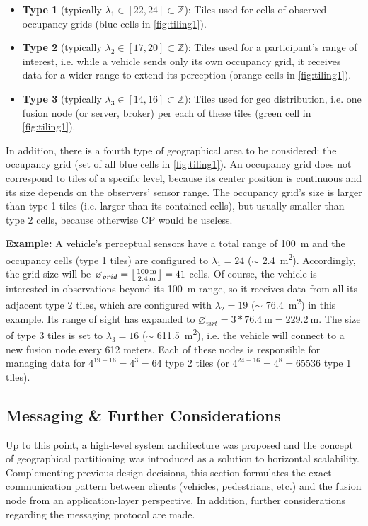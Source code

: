 \begin{itemize}
	\item \textbf{Type 1} (typically $\lambda_1 \in [22, 24] \subset \mathbb{Z}$): Tiles used for cells of observed occupancy grids (blue cells in \cref{fig:tiling1}).
	\item \textbf{Type 2} (typically $\lambda_2 \in [17, 20] \subset \mathbb{Z}$): Tiles used for a participant's range of interest, i.e. while a vehicle sends only its own occupancy grid, it receives data for a wider range to extend its perception (orange cells in \cref{fig:tiling1}).
	\item \textbf{Type 3} (typically $\lambda_3 \in [14, 16] \subset \mathbb{Z}$): Tiles used for geo distribution, i.e. one fusion node (or server, broker) per each of these tiles (green cell in \cref{fig:tiling1}).
\end{itemize}

In addition, there is a fourth type of geographical area to be considered: the occupancy grid (set of all blue cells in \cref{fig:tiling1}). An occupancy grid does not correspond to tiles of a specific level, because its center position is continuous and its size depends on the observers' sensor range. The occupancy grid's size is larger than type 1 tiles (i.e. larger than its contained cells), but usually smaller than type 2 cells, because otherwise CP would be useless. 
\par
\bigskip

\textbf{Example:} A vehicle's perceptual sensors have a total range of \SI{100}{\meter} and the occupancy cells (type 1 tiles) are configured to $\lambda_1 = 24$ ($\sim$ \SI{2.4}{\square\meter}). Accordingly, the grid size will be $\diameter_{grid} = \floor*{\frac{\SI{100}{\meter}}{\SI{2.4}{\meter}}} = 41$ cells. Of course, the vehicle is interested in observations beyond its \SI{100}{\meter} range, so it receives data from all its adjacent type 2 tiles, which are configured with $\lambda_2 = 19$ ($\sim$ \SI{76.4}{\square\meter}) in this example. Its range of sight has expanded to $\diameter_{virt} = 3 * \SI{76.4}{\meter} = \SI{229.2}{\meter}$. The size of type 3 tiles is set to $\lambda_3 = 16$ ($\sim$ \SI{611.5}{\square\meter}), i.e. the vehicle will connect to a new fusion node every 612 meters. Each of these nodes is responsible for managing data for $4^{19-16} = 4^3 = 64$ type 2 tiles (or $4^{24-16} = 4^8 = 65536$ type 1 tiles).

\subsection{Messaging \& Further Considerations}
\label{subsec:concept_design:messaging_further_considerations}
Up to this point, a high-level system architecture was proposed and the concept of geographical partitioning was introduced as a solution to horizontal scalability. Complementing previous design decisions, this section formulates the exact communication pattern between clients (vehicles, pedestrians, etc.) and the fusion node from an application-layer perspective. In addition, further considerations regarding the messaging protocol are made.
\par
\bigskip

